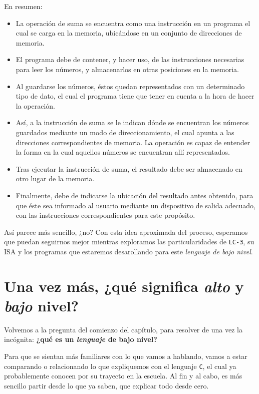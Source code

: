 \documentclass[a4paper, titlepage]{report}
\begin{document}
	En resumen:
	
	\begin{itemize}
		\item La operación de suma se encuentra como una instrucción en un programa el cual se carga en la memoria, ubicándose en un conjunto de direcciones de memoria.
		\item El programa debe de contener, y hacer uso, de las instrucciones necesarias para leer los números, y almacenarlos en otras posiciones en la memoria.
		\item Al guardarse los números, éstos quedan representados con un determinado tipo de dato, el cual el programa tiene que tener en cuenta a la hora de hacer la operación.
		\item Así, a la instrucción de suma se le indican dónde se encuentran los números guardados mediante un modo de direccionamiento, el cual apunta a las direcciones correspondientes de memoria. La operación es capaz de entender la forma en la cual aquellos números se encuentran allí representados.
		\item Tras ejecutar la instrucción de suma, el resultado debe ser almacenado en otro lugar de la memoria.
		\item Finalmente, debe de indicarse la ubicación del resultado antes obtenido, para que éste sea informado al usuario mediante un dispositivo de salida adecuado, con las instrucciones correspondientes para este propósito.
	\end{itemize}

	Así parece más sencillo, ¿no? Con esta idea aproximada del proceso, esperamos que puedan seguirnos mejor mientras exploramos las particularidades de \texttt{LC-3}, su ISA y los programas que estaremos desarollando para este \textit{lenguaje de bajo nivel}.

	\section{Una vez más, ¿qué significa \textit{alto} y \textit{bajo} nivel?}
	
	Volvemos a la pregunta del comienzo del capítulo, para resolver de una vez la incógnita: \textbf{¿qué es un \textit{lenguaje} de bajo nivel?}
	
	Para que se sientan más familiares con lo que vamos a hablando, vamos a estar comparando o relacionando lo que expliquemos con el lenguaje \texttt{C}, el cual ya probablemente conocen por su trayecto en la escuela. Al fin y al cabo, es más sencillo partir desde lo que ya saben, que explicar todo desde cero.\\
	
\end{document}
